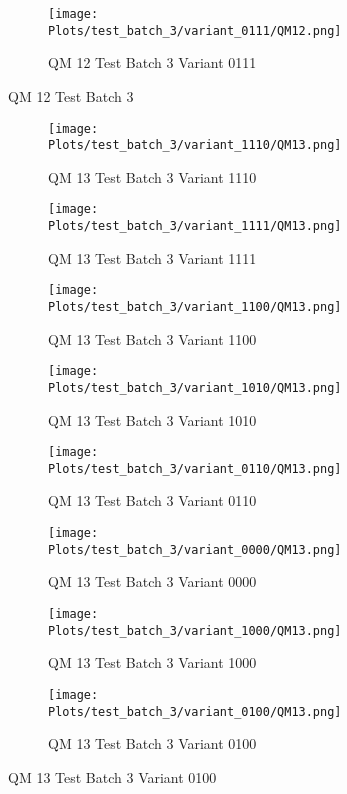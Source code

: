 \documentclass{DissertateFigs}
\begin{document}
\begin{figure}[t!]
\medskip

    \begin{subfigure}{0.47\textwidth}
    \texttt{[image: Plots/test\_batch\_3/variant\_0111/QM12.png]}
    \caption{QM 12 Test Batch 3 Variant 0111}
    \end{subfigure}
\caption{QM 12 Test Batch 3}
    \end{figure}
\clearpage
\begin{figure}[t!]
    \begin{subfigure}{0.47\textwidth}
    \texttt{[image: Plots/test\_batch\_3/variant\_1110/QM13.png]}
    \caption{QM 13 Test Batch 3 Variant 1110}
    \end{subfigure}
    \begin{subfigure}{0.47\textwidth}
    \texttt{[image: Plots/test\_batch\_3/variant\_1111/QM13.png]}
    \caption{QM 13 Test Batch 3 Variant 1111}
    \end{subfigure}

\medskip

    \begin{subfigure}{0.47\textwidth}
    \texttt{[image: Plots/test\_batch\_3/variant\_1100/QM13.png]}
    \caption{QM 13 Test Batch 3 Variant 1100}
    \end{subfigure}
    \begin{subfigure}{0.47\textwidth}
    \texttt{[image: Plots/test\_batch\_3/variant\_1010/QM13.png]}
    \caption{QM 13 Test Batch 3 Variant 1010}
    \end{subfigure}

\medskip

    \begin{subfigure}{0.47\textwidth}
    \texttt{[image: Plots/test\_batch\_3/variant\_0110/QM13.png]}
    \caption{QM 13 Test Batch 3 Variant 0110}
    \end{subfigure}
    \begin{subfigure}{0.47\textwidth}
    \texttt{[image: Plots/test\_batch\_3/variant\_0000/QM13.png]}
    \caption{QM 13 Test Batch 3 Variant 0000}
    \end{subfigure}

\medskip

    \begin{subfigure}{0.47\textwidth}
    \texttt{[image: Plots/test\_batch\_3/variant\_1000/QM13.png]}
    \caption{QM 13 Test Batch 3 Variant 1000}
    \end{subfigure}
    \begin{subfigure}{0.47\textwidth}
    \texttt{[image: Plots/test\_batch\_3/variant\_0100/QM13.png]}
    \caption{QM 13 Test Batch 3 Variant 0100}
    \end{subfigure}


\end{figure}
\end{document}
